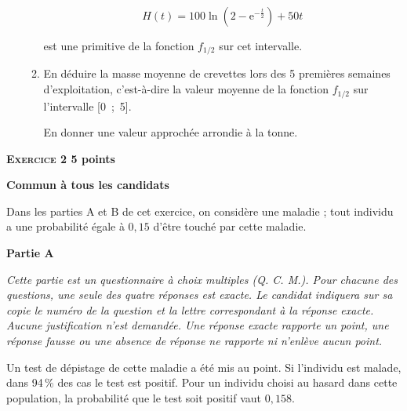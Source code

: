 \documentclass[10pt,a4paper]{article}
\begin{document}
\begin{enumerate}
\begin{enumerate}
		\[H(t) = 100\ln \left(2 - \text{e}^{- \frac{t}{2}}\right) + 50t\]
		
est une primitive de la fonction $f_{1/2}$ sur cet intervalle.
		\item En déduire la masse moyenne de crevettes lors des 5 premières semaines d'exploitation, c'est-à-dire la valeur moyenne de la fonction $f_{1/2}$ sur l'intervalle [0~;~5].
		
En donner une valeur approchée arrondie à la tonne.
	\end{enumerate}
\end{enumerate}

\vspace{0,5cm}

\textbf{\textsc{\bf Exercice 2} \hfill 5 points}
 
\medskip
 
\textbf{Commun  à tous les candidats}

\bigskip

Dans les parties A et B de cet exercice, on considère une maladie ; tout individu a une probabilité égale à $0,15$ d'être touché par cette maladie.

\bigskip

\textbf{Partie A }

\medskip

\emph{Cette partie est un questionnaire à choix multiples (Q. C. M.). Pour chacune des questions, une seule des quatre réponses est exacte. Le candidat indiquera sur sa copie le numéro de la question et la lettre correspondant à la réponse exacte. Aucune justification n'est demandée. Une réponse exacte rapporte un point, une réponse fausse ou une absence de réponse ne rapporte ni n'enlève aucun point.}

\medskip

Un test de dépistage de cette maladie a été mis au point. Si l'individu est malade, dans 94\,\% des cas le test est positif. Pour un individu choisi au hasard dans cette population, la probabilité que le test soit positif vaut $0,158$.

\medskip
\end{document}
